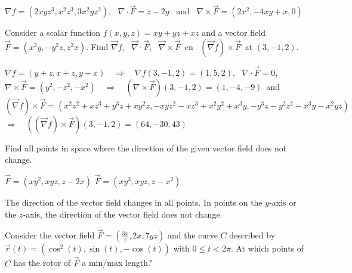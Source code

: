 \begin{Answer}
    $\nabla f  = (2xyz^3, x^2 z^3, 3x^2yz^2)$, \, $\nabla  \cdot \vec F = z-2y$ \, and \, $ \nabla \times \vec F = (2x^2, -4xy+x,0)$
\end{Answer}

\begin{Exercise}[difficulty = 2] Consider a scalar function $f(x,y,z)=xy+yz+xz$ and a vector field $\vec F = (x^2y, -y^2z, z^2x)$. Find $\vec{\nabla} f$, \, $\vec{\nabla}  \cdot \vec F$, \, $\vec{\nabla} \times \vec F $\, en \, $(\vec{\nabla} f) \times \vec F $\, at $(3,-1,2)$.
\end{Exercise}

\begin{Answer}

    $\nabla f  = (y+z, x+z, y+x) \quad \Rightarrow \quad \nabla f(3,-1,2)  = (1, 5, 2)$, \,    $\nabla  \cdot \vec F = 0$,\\[0.2cm] 
    $ \nabla \times \vec F = (y^2, -z^2,-x^2) \quad \Rightarrow \quad (\nabla \times \vec F)(3,-1,2) = (1,-4,-9)$\, and \\[0.2cm] $(\vec \nabla f) \times \vec F = (x^2 z^2+xz^3+y^3z+xy^2z, -xyz^2-xz^3+x^2y^2+x^3y,-y^3z-y^2z^2-x^3y-x^2yz) $ \\[0.2cm] 
    $\Rightarrow \quad ((\vec \nabla f) \times \vec F)(3,-1,2) = (64,-30,43)  $
\end{Answer}

\begin{Exercise} Find all points in space where the direction of the given vector field does not change. 
    \begin{multicols}{2}
        \Question[difficulty = 2] $\vec F = (xy^2, xyz, z-2x)$
        \Question[difficulty = 3] $\vec F = (xy^3, xyz, z-x^2)$
        \EndCurrentQuestion
    \end{multicols}
\end{Exercise}

\begin{Answer}
    
        \Question The direction of the vector field changes in all points.
        \Question In points on the $y$-axis or the $z$-axis, the direction of the vector field does not change.
    
\end{Answer}

\begin{Exercise}[difficulty = 3] Consider the vector field $\vec F = \left(\frac{3x}{z}, 2x, 7yz \right)$ and the curve $C$ described by  $\vec r(t) = (\cos^2(t), \sin (t), -\cos(t))$ with $0 \leq t < 2 \pi$. At which points of $C$ has the rotor of $\vec F$ a min/max length?
\end{Exercise}


